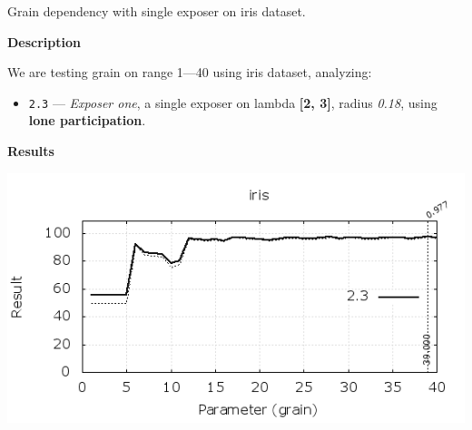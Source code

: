 \begin{experiment}{Grain dependency with single exposer on iris dataset.}{\small \sffamily\textbf{Description}

We are testing grain on range 1---40 using iris dataset, analyzing:

\begin{itemize}
\tightlist
	\item \texttt{2.3} --- \emph{Exposer one}, a single exposer on lambda \textbf{[2, 3]}, radius \emph{0.18}, using \textbf{lone participation}.

\end{itemize}


\textbf{Results}

\centering
	\includegraphics[width=.75\textwidth]{plots/experiment_2_iris.png}
	\label{fig:experiment_2}
}\end{experiment}